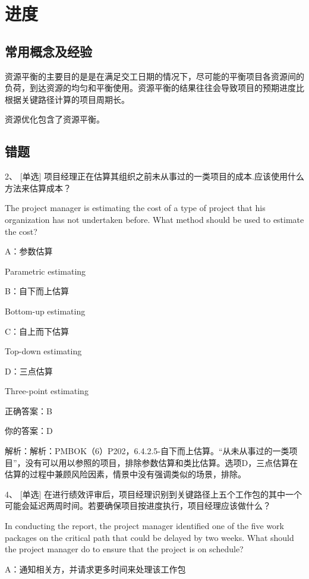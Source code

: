 
\chapter{进度}

\section{常用概念及经验}

资源平衡的主要目的是是在满足交工日期的情况下，尽可能的平衡项目各资源间的负荷，到达资源的均匀和平衡使用。资源平衡的结果往往会导致项目的预期进度比根据关键路径计算的项目周期长。

资源优化包含了资源平衡。


\section{错题}

2、 [单选] 项目经理正在估算其组织之前未从事过的一类项目的成本.应该使用什么方法来估算成本？

The project manager is estimating the cost of a type of project that his organization has not undertaken before. What method should be used to estimate the cost?

A：参数估算

Parametric estimating

B：自下而上估算

Bottom-up estimating

C：自上而下估算

Top-down estimating

D：三点估算

Three-point estimating

正确答案：B

你的答案：D

解析：解析：PMBOK（6）P202，6.4.2.5-自下而上估算。“从未从事过的一类项目”，没有可以用以参照的项目，排除参数估算和类比估算。选项D，三点估算在估算的过程中兼顾风险因素，情景中没有强调类似的场景，排除。



4、 [单选] 在进行绩效评审后，项目经理识别到关键路径上五个工作包的其中一个可能会延迟两周时间。若要确保项目按进度执行，项目经理应该做什么？

In conducting the report, the project manager identified one of the five work packages on the critical path that could be delayed by two weeks. What should the project manager do to ensure that the project is on schedule?

A：通知相关方，并请求更多时间来处理该工作包

